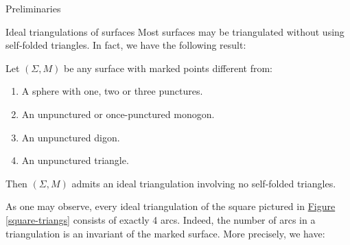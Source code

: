 \begin{chapter}{Preliminaries}
\begin{section}{Ideal triangulations of surfaces}
Most surfaces may be triangulated without using self-folded triangles. In fact, we have the following result:

\begin{prop}\label{no-self-folds} Let $(\Sigma, M)$ be any surface with marked points different from:
\begin{enumerate}
\item A sphere with one, two or three punctures.
\item An unpunctured or once-punctured monogon.
\item An unpunctured digon.
\item An unpunctured triangle.
\end{enumerate}
Then $(\Sigma, M)$ admits an ideal triangulation involving no self-folded triangles. \hfill\qedsymbol
\end{prop}

As one may observe, every ideal triangulation of the square pictured in \hyperref[square-triangs]{Figure \ref*{square-triangs}} consists of exactly 4 arcs. Indeed, the number of arcs in a triangulation is an invariant of the marked surface. More precisely, we have:


\end{section}
\end{chapter}

